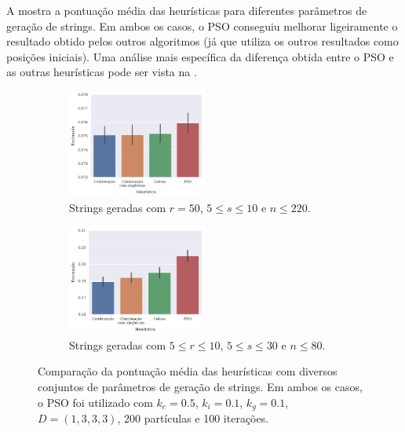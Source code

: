     A  mostra a pontuação média das heurísticas para diferentes parâmetros de geração de strings. Em ambos os casos, o PSO conseguiu melhorar ligeiramente o resultado obtido pelos outros algoritmos (já que utiliza os outros resultados como posições iniciais). Uma análise mais específica da diferença obtida entre o PSO e as outras heurísticas pode ser vista na .

    \begin{figure}[htb]
        \centering
        \begin{subfigure}[b]{\textwidth}
            \centering
            \includegraphics[width=0.5\textwidth]{images/r50-s-5-10-n220-ke0.5-ki0.1-kg0.1-dist1-3-3-3-iter100-part200.pdf}
            \caption{Strings geradas com $r = 50$, $5 \leq s \leq 10$ e $n \leq 220$.}
            \vspace{12pt}
        \end{subfigure}
        \begin{subfigure}[b]{\textwidth}
            \centering
            \includegraphics[width=0.5\textwidth]{images/r-5-10-s-5-30-n80-ke0.5-ki0.1-kg0.1-dist1-3-3-3-iter100-part200.pdf}
            \caption{Strings geradas com $5 \leq r \leq 10$, $5 \leq s \leq 30$ e $n \leq 80$.}
            \vspace{12pt}
        \end{subfigure}
        \caption{Comparação da pontuação média das heurísticas com diversos conjuntos de parâmetros de geração de strings. Em ambos os casos, o PSO foi utilizado com $k_e = 0.5$, $k_i = 0.1$, $k_g = 0.1$, $D = (1, 3, 3, 3)$, 200 partículas e 100 iterações.}
        \label{fig:comparacao-pontuacao}
    \end{figure}

